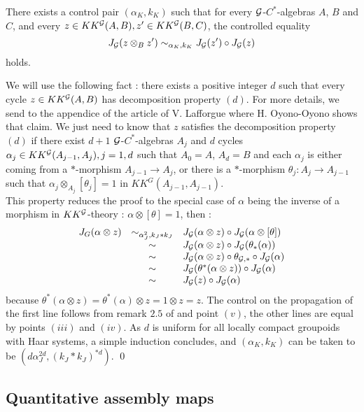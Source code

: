 \begin{prop} There exists a control pair $(\alpha_K,k_K)$ such that for every $\mathcal G$-$C^*$-algebras $A$, $B$ and $C$, and every $z\in KK^\mathcal G(A,B),z'\in KK^\mathcal G(B,C)$, the controlled equality
\[J_\mathcal G(z\otimes_B z') \sim_{\alpha_K,k_K} J_\mathcal G(z')\circ J_\mathcal G(z)\]
holds.
\end{prop}
\begin{dem}
We will use the following fact : there exists a positive integer $d$ such that every cycle $z\in KK^\mathcal G(A,B)$ has decomposition property $(d)$. For more details, we send to the appendice of the article of V. Lafforgue \cite{LaffOY} where H. Oyono-Oyono shows that claim. We just need to know that $z$ satisfies the decomposition property $(d)$ if there exist $d+1$ $\mathcal G$-$C^*$-algebras $A_j$  and $d$ cycles $\alpha_j\in KK^\mathcal G(A_{j-1},A_j), j=1,d$ such that $A_0=A$, $A_d=B$ and each $\alpha_j$ is either coming from a $*$-morphism $A_{j-1}\rightarrow A_j$, or there is a $*$-morphism $\theta_j: A_j\rightarrow A_{j-1}$ such that $\alpha_j \otimes_{A_j} [\theta_j]=1$ in $KK^G(A_{j-1},A_{j-1})$.\\

This property reduces the proof to the special case of $\alpha$ being the inverse of a morphism in $KK^\mathcal G$-theory : $\alpha\otimes[\theta]=1$, then :
\[\begin{array}{rcl}
J_G (\alpha\otimes z) & \sim_{\alpha_J^2,k_J*k_J} &  J_\mathcal G(\alpha\otimes z)\circ J_\mathcal G(\alpha\otimes [\theta]) \\
			& \sim & J_\mathcal G(\alpha\otimes z)\circ J_\mathcal G(\theta_*(\alpha))\\
			& \sim & J_\mathcal G(\alpha\otimes z)\circ \theta_{\mathcal G,*}\circ J_\mathcal G(\alpha)\\
			& \sim & J_\mathcal G(\theta^*(\alpha\otimes z))\circ J_\mathcal G(\alpha)\\
			& \sim & J_\mathcal G(z)\circ J_\mathcal G(\alpha) \\
\end{array}\] 
because $\theta^*(\alpha\otimes z)=\theta^*(\alpha)\otimes z=1\otimes z =z$. The control on the propagation of the first line follows from remark $2.5$ of \cite{OY2} and point $(v)$, the other lines are equal by points $(iii)$ and $(iv)$. As $d$ is uniform for all locally compact groupoids with Haar systems, a simple induction concludes, and $(\alpha_K,k_K)$ can be taken to be $(d \alpha_J^{2d},( k_J*k_J)^{*d})$.
\qed
\end{dem}

\subsection{Quantitative assembly maps}

